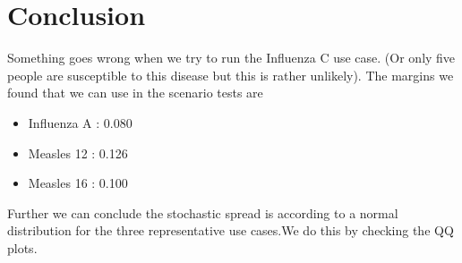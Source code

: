 \documentclass[a4paper]{article}
\begin{document}
\section*{Conclusion}
Something goes wrong when we try to run the Influenza C use case. (Or only five people are susceptible to this disease but this is rather unlikely). The margins we found that we can use in the scenario tests are
\begin{itemize}
\item Influenza A : 0.080
\item Measles 12  : 0.126
\item Measles 16  : 0.100  
\end{itemize}      
Further we can conclude the stochastic spread is according to a normal distribution for the three representative use cases.We do this by checking the QQ plots.
\end{document}
